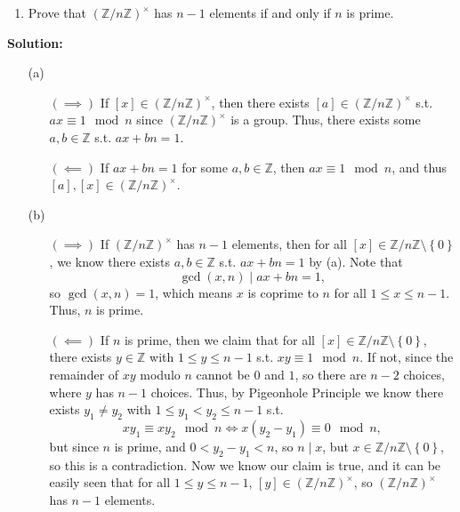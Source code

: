 \begin{enumerate}
\begin{enumerate}
        \item Prove that $(\mathbb{Z}/n\mathbb{Z})^\times$ has $n-1$ elements if and only if $n$ is prime.
    \end{enumerate}
    \textbf{Solution:} \vphantom{text}
    \begin{itemize}
        \item [(a)] 
        \begin{itemize}
            \item [\((\implies )\)] If \([x] \in (\mathbb{Z} / n \mathbb{Z})^{\times} \), then there exists \([a] \in (\mathbb{Z} / n \mathbb{Z})^{\times } \) s.t. \(a x \equiv 1 \mod{n}\) since \((\mathbb{Z} / n \mathbb{Z})^{\times } \) is a group. Thus, there exists some \(a, b \in \mathbb{Z} \) s.t. \(ax + bn = 1\). 
            \item [\((\impliedby )\)] If \(ax + bn = 1\) for some \(a, b \in \mathbb{Z} \), then \(ax \equiv 1 \mod{n}\), and thus \([a], [x] \in (\mathbb{Z} / n \mathbb{Z})^{\times } \).          
        \end{itemize}
        \item [(b)] 
        \begin{itemize}
            \item [\((\implies )\)] If \((\mathbb{Z} / n \mathbb{Z} )^{\times }\) has \(n-1\) elements, then for all \([x] \in \mathbb{Z} / n \mathbb{Z} \setminus \left\{ 0 \right\} \), we know there exists \(a, b \in \mathbb{Z} \) s.t. \(ax + bn = 1\) by (a). Note that 
            \[
                \gcd(x, n) \mid ax + bn = 1,
            \]  so \(\gcd(x, n) = 1\), which means \(x\) is coprime to \(n\) for all \(1 \le x \le n-1\). Thus, \(n\) is prime.    
            \item [\((\impliedby )\)] If \(n\) is prime, then we claim that for all \([x] \in \mathbb{Z} / n \mathbb{Z} \setminus \left\{ 0 \right\} \), there exists \(y \in \mathbb{Z} \) with \(1 \le y \le n-1\) s.t. \(xy \equiv 1 \mod{n}\). If not, since the remainder of \(xy\) modulo \(n\) cannot be \(0\) and \(1\), so there are \(n-2\) choices, where \(y\) has \(n-1\) choices. Thus, by Pigeonhole Principle we know there exists \(y_1 \neq y_2\) with \(1 \le y_1 < y_2 \le n-1\) s.t. 
            \[
                x y_1 \equiv x y_2 \mod{n} \iff x(y_2 - y_1) \equiv 0 \mod{n},
            \] but since \(n\) is prime, and \(0 < y_2 - y_1 < n\), so \(n \mid x\), but \(x \in \mathbb{Z} / n \mathbb{Z} \setminus \left\{ 0 \right\} \), so this is a contradiction. Now we know our claim is true, and it can be easily seen that for all \(1 \le y \le n-1\), \([y] \in (\mathbb{Z} / n \mathbb{Z} )^{\times }\), so \((\mathbb{Z} / n \mathbb{Z} )^{\times }\) has \(n-1\) elements.     
        \end{itemize}
    \end{itemize} 
    \vphantom{text}


\end{enumerate}

